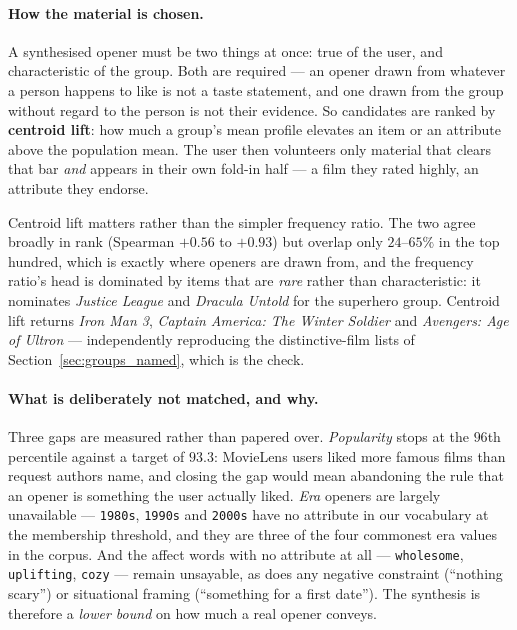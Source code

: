 \documentclass[11pt]{article}
\begin{document}
\paragraph{How the material is chosen.} A synthesised opener must be two things at once: true of the
user, and characteristic of the group. Both are required --- an opener drawn from whatever a person
happens to like is not a taste statement, and one drawn from the group without regard to the person
is not their evidence. So candidates are ranked by \textbf{centroid lift}: how much a group's mean
profile elevates an item or an attribute above the population mean. The user then volunteers only
material that clears that bar \emph{and} appears in their own fold-in half --- a film they rated
highly, an attribute they endorse.

Centroid lift matters rather than the simpler frequency ratio. The two agree broadly in rank
(Spearman $+0.56$ to $+0.93$) but overlap only $24$--$65\%$ in the top hundred, which is exactly where
openers are drawn from, and the frequency ratio's head is dominated by items that are \emph{rare}
rather than characteristic: it nominates \emph{Justice League} and \emph{Dracula Untold} for the
superhero group. Centroid lift returns \emph{Iron Man 3}, \emph{Captain America: The Winter Soldier}
and \emph{Avengers: Age of Ultron} --- independently reproducing the distinctive-film lists of
Section~\ref{sec:groups_named}, which is the check.

\paragraph{What is deliberately not matched, and why.} Three gaps are measured rather than papered
over. \emph{Popularity} stops at the $96$th percentile against a target of $93.3$: MovieLens users
liked more famous films than request authors name, and closing the gap would mean abandoning the rule
that an opener is something the user actually liked. \emph{Era} openers are largely unavailable ---
\texttt{1980s}, \texttt{1990s} and \texttt{2000s} have no attribute in our vocabulary at the
membership threshold, and they are three of the four commonest era values in the corpus. And the
affect words with no attribute at all --- \texttt{wholesome}, \texttt{uplifting}, \texttt{cozy} ---
remain unsayable, as does any negative constraint (``nothing scary'') or situational framing
(``something for a first date''). The synthesis is therefore a \emph{lower bound} on how much a real
opener conveys.
\end{document}
